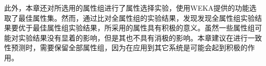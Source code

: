 此外，本章还对所选用的属性组进行了属性选择实验，使用WEKA提供的功能选取了最佳属性集。然而，通过比对全属性组的实验结果，发现发现全属性组实验结果要优于最佳属性组实验结果，所采用的属性具有积极的意义。虽然一些属性组可能对实验结果没有显着的影响，但是其也不具有消极的影响。本章建议在进行一致性预测时，需要保留全部属性组，因为在应用到其它系统是可能会起到积极的作用。
